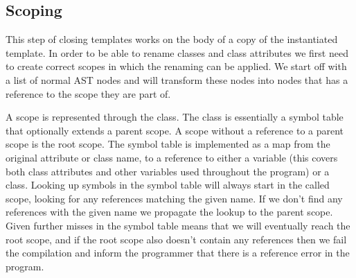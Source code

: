 %
%

\subsection{Scoping}\label{subsec:inst-scoping}

This step of closing templates works on the body of a copy of the instantiated template.
In order to be able to rename classes and class attributes we first need to create correct scopes in which the renaming can be applied.
We start off with a list of normal AST nodes and will transform these nodes into nodes that has a reference to the scope they are part of.

A scope is represented through the  class.
The  class is essentially a symbol table that optionally extends a parent scope.
A scope without a reference to a parent scope is the root scope.
The symbol table is implemented as a map from the original attribute or class name, to a reference to either a variable (this covers both class attributes and other variables used throughout the program) or a class.
Looking up symbols in the symbol table will always start in the called scope, looking for any references matching the given name.
If we don't find any references with the given name we propagate the lookup to the parent scope.
Given further misses in the symbol table means that we will eventually reach the root scope, and if the root scope also doesn't contain any references then we fail the compilation and inform the programmer that there is a reference error in the program.

